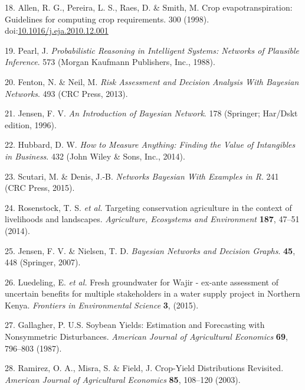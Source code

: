 \documentclass[12pt,oneside]{article}
\begin{document}
\leavevmode\hypertarget{ref-Allen_et_al_1998}{}%
18. Allen, R. G., Pereira, L. S., Raes, D. \& Smith, M. Crop evapotranspiration: Guidelines for computing crop requirements. 300 (1998). doi:\href{https://doi.org/10.1016/j.eja.2010.12.001}{10.1016/j.eja.2010.12.001}

\leavevmode\hypertarget{ref-Pearl_1988}{}%
19. Pearl, J. \emph{Probabilistic Reasoning in Intelligent Systems: Networks of Plausible Inference}. 573 (Morgan Kaufmann Publishers, Inc., 1988).

\leavevmode\hypertarget{ref-Fenton_and_Neil_2013}{}%
20. Fenton, N. \& Neil, M. \emph{Risk Assessment and Decision Analysis With Bayesian Networks}. 493 (CRC Press, 2013).

\leavevmode\hypertarget{ref-Jensen_1996}{}%
21. Jensen, F. V. \emph{An Introduction of Bayesian Network}. 178 (Springer; Har/Dskt edition, 1996).

\leavevmode\hypertarget{ref-Hubbard_2014}{}%
22. Hubbard, D. W. \emph{How to Measure Anything: Finding the Value of Intangibles in Business}. 432 (John Wiley \& Sons, Inc., 2014).

\leavevmode\hypertarget{ref-Scutari_and_Denis_2015}{}%
23. Scutari, M. \& Denis, J.-B. \emph{Networks Bayesian With Examples in R}. 241 (CRC Press, 2015).

\leavevmode\hypertarget{ref-Rosenstock_et_al_2014}{}%
24. Rosenstock, T. S. \emph{et al.} Targeting conservation agriculture in the context of livelihoods and landscapes. \emph{Agriculture, Ecosystems and Environment} \textbf{187}, 47--51 (2014).

\leavevmode\hypertarget{ref-Jensen_and_Nielsen_2007}{}%
25. Jensen, F. V. \& Nielsen, T. D. \emph{Bayesian Networks and Decision Graphs}. \textbf{45}, 448 (Springer, 2007).

\leavevmode\hypertarget{ref-Luedeling_et_al_2015}{}%
26. Luedeling, E. \emph{et al.} Fresh groundwater for Wajir - ex-ante assessment of uncertain benefits for multiple stakeholders in a water supply project in Northern Kenya. \emph{Frontiers in Environmental Science} \textbf{3}, (2015).

\leavevmode\hypertarget{ref-Gallagher_1987}{}%
27. Gallagher, P. U.S. Soybean Yields: Estimation and Forecasting with Nonsymmetric Disturbances. \emph{American Journal of Agricultural Economics} \textbf{69}, 796--803 (1987).

\leavevmode\hypertarget{ref-Ramirez_et_al_2003}{}%
28. Ramirez, O. A., Misra, S. \& Field, J. Crop-Yield Distributions Revisited. \emph{American Journal of Agricultural Economics} \textbf{85}, 108--120 (2003).
\end{document}

